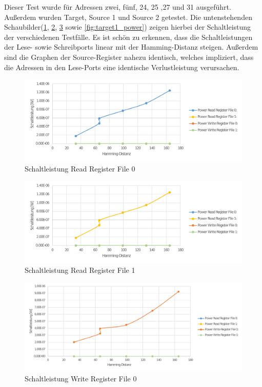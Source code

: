 Dieser Test wurde für Adressen zwei, fünf, 24, 25 ,27 und 31 ausgeführt. Außerdem wurden Target, Source 1 und Source 2 getestet. Die untenstehenden Schaubilder(\ref{fig:source0_power}, \ref{fig:source1_power}, \ref{fig:target0_power} sowie \ref{fig:target1_power}) zeigen hierbei der Schaltleistung der verschiedenen Testfälle. Es ist schön zu erkennen, dass die Schaltleistungen der Lese- sowie Schreibports linear mit der Hamming-Distanz steigen. Außerdem sind die Graphen der Source-Register nahezu identisch, welches impliziert, dass die Adressen in den Lese-Ports eine identische Verlustleistung verursachen.\\

\begin{figure}[H]
	\centering
	\includegraphics[width=\textwidth]{fig/source1_power.pdf}
	\caption{Schaltleistung Read Register File 0}
	\label{fig:source0_power}
\end{figure}
\begin{figure}[H]
	\centering
	\includegraphics[width=\textwidth]{fig/source2_power.pdf}
	\caption{Schaltleistung Read Register File 1}
	\label{fig:source1_power}
\end{figure}
\begin{figure}[H]
	\centering
	\includegraphics[width=\textwidth]{fig/register_eval_target_port0.pdf}
	\caption{Schaltleistung Write Register File 0}
	\label{fig:target0_power}
\end{figure}
